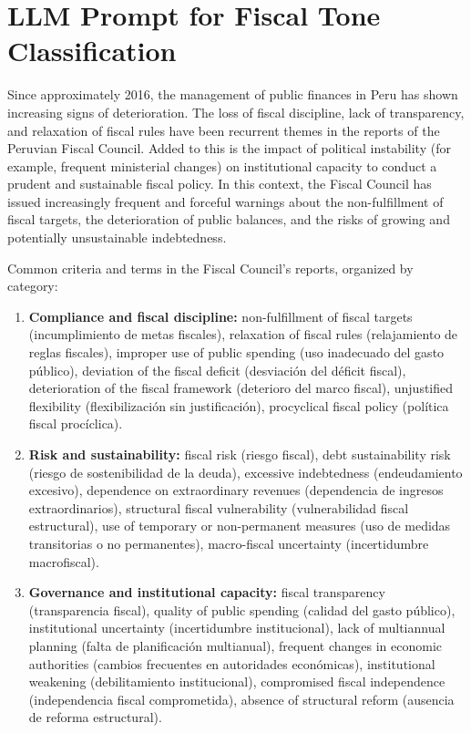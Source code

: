\documentclass[a4paper, fleqn, 12pt]{article}
\begin{document}
\appendix
\clearpage
\section{LLM Prompt for Fiscal Tone Classification}

\begingroup
\small
\ttfamily

Since approximately 2016, the management of public finances in Peru has shown increasing signs of deterioration. The loss of fiscal discipline, lack of transparency, and relaxation of fiscal rules have been recurrent themes in the reports of the Peruvian Fiscal Council. Added to this is the impact of political instability (for example, frequent ministerial changes) on institutional capacity to conduct a prudent and sustainable fiscal policy. In this context, the Fiscal Council has issued increasingly frequent and forceful warnings about the non-fulfillment of fiscal targets, the deterioration of public balances, and the risks of growing and potentially unsustainable indebtedness.



Common criteria and terms in the Fiscal Council's reports, organized by category:

\begin{enumerate}
  \item  \textbf{Compliance and fiscal discipline:}   non-fulfillment of fiscal targets (incumplimiento de metas fiscales), relaxation of fiscal rules (relajamiento de reglas fiscales), improper use of public spending (uso inadecuado del gasto público), deviation of the fiscal deficit (desviación del déficit fiscal), deterioration of the fiscal framework (deterioro del marco fiscal), unjustified flexibility (flexibilización sin justificación), procyclical fiscal policy (política fiscal procíclica).

  \item  \textbf{Risk and sustainability:} fiscal risk (riesgo fiscal), debt sustainability risk (riesgo de sostenibilidad de la deuda), excessive indebtedness (endeudamiento excesivo), dependence on extraordinary revenues (dependencia de ingresos extraordinarios), structural fiscal vulnerability (vulnerabilidad fiscal estructural), use of temporary or non-permanent measures (uso de medidas transitorias o no permanentes), macro-fiscal uncertainty (incertidumbre macrofiscal).

  \item \textbf{Governance and institutional capacity:}  fiscal transparency (transparencia fiscal), quality of public spending (calidad del gasto público), institutional uncertainty (incertidumbre institucional), lack of multiannual planning (falta de planificación multianual), frequent changes in economic authorities (cambios frecuentes en autoridades económicas), institutional weakening (debilitamiento institucional), compromised fiscal independence (independencia fiscal comprometida), absence of structural reform (ausencia de reforma estructural).
\end{enumerate}
\end{document}
